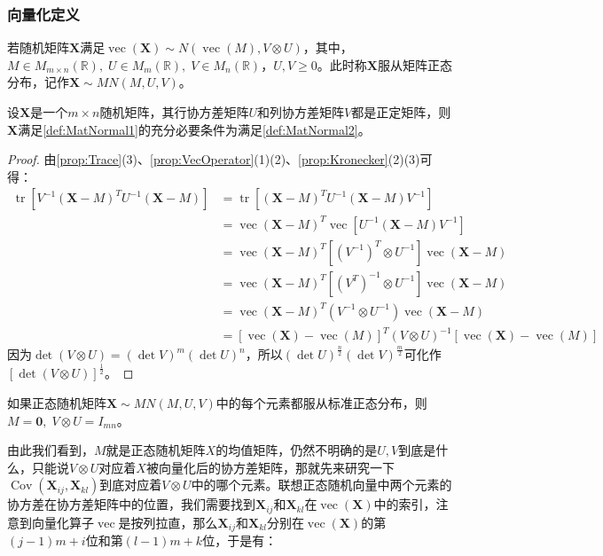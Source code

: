 \subsubsection{向量化定义}
\begin{definition}\label{def:MatNormal2}
	若随机矩阵$\mathbf{X}$满足$\operatorname{vec}(\mathbf{X})\sim N(\operatorname{vec}(M),V\otimes U)$，其中，$M\in M_{m\times n}(\mathbb{R}),\;U\in M_{m}(\mathbb{R}),\;V\in M_{n}(\mathbb{R})$，$U,V\geqslant0$。此时称$\mathbf{X}$服从矩阵正态分布，记作$\mathbf{X}\sim MN(M,U,V)$。
\end{definition}
\begin{theorem}
	设$\mathbf{X}$是一个$m\times n$随机矩阵，其行协方差矩阵$U$和列协方差矩阵$V$都是正定矩阵，则$\mathbf{X}$满足\cref{def:MatNormal1}的充分必要条件为满足\cref{def:MatNormal2}。
\end{theorem}
\begin{proof}
	由\cref{prop:Trace}(3)、\cref{prop:VecOperator}(1)(2)、\cref{prop:Kronecker}(2)(3)可得：
	\begin{align*}
		\operatorname{tr}[V^{-1}(\mathbf{X}-M)^TU^{-1}(\mathbf{X}-M)]
		&=\operatorname{tr}[(\mathbf{X}-M)^TU^{-1}(\mathbf{X}-M)V^{-1}] \\
		&=\operatorname{vec}(\mathbf{X}-M)^T\operatorname{vec}[U^{-1}(\mathbf{X}-M)V^{-1}] \\
		&=\operatorname{vec}(\mathbf{X}-M)^T[(V^{-1})^T\otimes U^{-1}]\operatorname{vec}(\mathbf{X}-M) \\
		&=\operatorname{vec}(\mathbf{X}-M)^T[(V^T)^{-1}\otimes U^{-1}]\operatorname{vec}(\mathbf{X}-M) \\
		&=\operatorname{vec}(\mathbf{X}-M)^T(V^{-1}\otimes U^{-1})\operatorname{vec}(\mathbf{X}-M) \\
		&=[\operatorname{vec}(\mathbf{X})-\operatorname{vec}(M)]^T(V\otimes U)^{-1}[\operatorname{vec}(\mathbf{X})-\operatorname{vec}(M)]
	\end{align*}
	因为$\det(V\otimes U)=(\det V)^m(\det U)^n$，所以$(\det U)^{\frac{n}{2}}(\det V)^{\frac{m}{2}}$可化作$[\det(V\otimes U)]^{\frac{1}{2}}$。
\end{proof}
\begin{corollary}
	如果正态随机矩阵$\mathbf{X}\sim MN(M,U,V)$中的每个元素都服从标准正态分布，则$M=\mathbf{0},\;V\otimes U=I_{mn}$。
\end{corollary}
由此我们看到，$M$就是正态随机矩阵$X$的均值矩阵，仍然不明确的是$U,V$到底是什么，只能说$V\otimes U$对应着$X$被向量化后的协方差矩阵，那就先来研究一下$\operatorname{Cov}(\mathbf{X}_{ij},\mathbf{X}_{kl})$到底对应着$V\otimes U$中的哪个元素。联想正态随机向量中两个元素的协方差在协方差矩阵中的位置，我们需要找到$\mathbf{X}_{ij}$和$\mathbf{X}_{kl}$在$\operatorname{vec}(\mathbf{X})$中的索引，注意到向量化算子$\operatorname{vec}$是按列拉直，那么$\mathbf{X}_{ij}$和$\mathbf{X}_{kl}$分别在$\operatorname{vec}(\mathbf{X})$的第$(j-1)m+i$位和第$(l-1)m+k$位，于是有：
